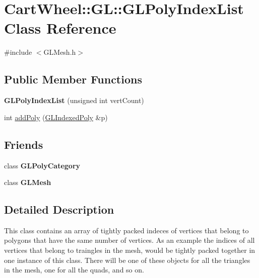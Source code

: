 \hypertarget{classCartWheel_1_1GL_1_1GLPolyIndexList}{
\section{CartWheel::GL::GLPolyIndexList Class Reference}
\label{classCartWheel_1_1GL_1_1GLPolyIndexList}
}


{\ttfamily \#include $<$GLMesh.h$>$}

\subsection*{Public Member Functions}
\begin{DoxyCompactItemize}
\item 
\hypertarget{classCartWheel_1_1GL_1_1GLPolyIndexList_a1566961a6aa1adc463ac6b158edfc2c9}{
{\bfseries GLPolyIndexList} (unsigned int vertCount)}
\label{classCartWheel_1_1GL_1_1GLPolyIndexList_a1566961a6aa1adc463ac6b158edfc2c9}

\item 
int \hyperlink{classCartWheel_1_1GL_1_1GLPolyIndexList_ae9760cd87383177864175e4c6b7b7d6c}{addPoly} (\hyperlink{classCartWheel_1_1GL_1_1GLIndexedPoly}{GLIndexedPoly} \&p)
\end{DoxyCompactItemize}
\subsection*{Friends}
\begin{DoxyCompactItemize}
\item 
\hypertarget{classCartWheel_1_1GL_1_1GLPolyIndexList_ae74f0661e50601fed5e420fd78bb98b9}{
class {\bfseries GLPolyCategory}}
\label{classCartWheel_1_1GL_1_1GLPolyIndexList_ae74f0661e50601fed5e420fd78bb98b9}

\item 
\hypertarget{classCartWheel_1_1GL_1_1GLPolyIndexList_a7ad5c94227dd02947e02998b7eaaf5d9}{
class {\bfseries GLMesh}}
\label{classCartWheel_1_1GL_1_1GLPolyIndexList_a7ad5c94227dd02947e02998b7eaaf5d9}

\end{DoxyCompactItemize}


\subsection{Detailed Description}
This class contains an array of tightly packed indeces of vertices that belong to polygons that have the same number of vertices. As an example the indices of all vertices that belong to traingles in the mesh, would be tightly packed together in one instance of this class. There will be one of these objects for all the triangles in the mesh, one for all the quads, and so on. 


